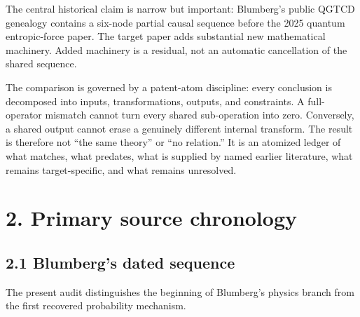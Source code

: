 \documentclass[
  american,
  11pt,
  letterpaper,
]{article}
\begin{document}
The central historical claim is narrow but important: Blumberg's public QGTCD genealogy contains a six-node partial causal sequence before the 2025 quantum entropic-force paper. The target paper adds substantial new mathematical machinery. Added machinery is a residual, not an automatic cancellation of the shared sequence.

The comparison is governed by a patent-atom discipline: every conclusion is decomposed into inputs, transformations, outputs, and constraints. A full-operator mismatch cannot turn every shared sub-operation into zero. Conversely, a shared output cannot erase a genuinely different internal transform. The result is therefore not ``the same theory'' or ``no relation.'' It is an atomized ledger of what matches, what predates, what is supplied by named earlier literature, what remains target-specific, and what remains unresolved.

\section{2. Primary source chronology}\label{primary-source-chronology}

\subsection{2.1 Blumberg's dated sequence}\label{blumbergs-dated-sequence}

The present audit distinguishes the beginning of Blumberg's physics branch from the first recovered probability mechanism.
\end{document}
